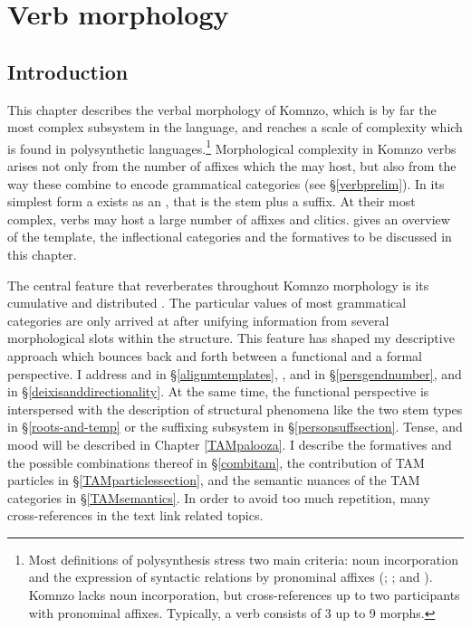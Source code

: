 
\chapter{Verb morphology} \label{cha:verb morphology}

\section{Introduction} \label{verbmorphintro}

This chapter describes the verbal morphology of Komnzo, which is by far the most complex subsystem in the language, and reaches a scale of complexity which is found in polysynthetic languages.\footnote{Most definitions of polysynthesis stress two main criteria: noun incorporation and the expression of syntactic relations by pronominal affixes (\citealt[16]{Baker:1996poly}; \citealt[2]{Evans:2002sasse}; and \citealt{Mithun:2009wh}). Komnzo lacks noun incorporation, but cross-references up to two participants with pronominal affixes. Typically, a verb consists of 3 up to 9 morphs.} Morphological complexity in Komnzo verbs arises not only from the number of affixes which the  may host, but also from the way these combine to encode grammatical categories (see \S{}\ref{verbprelim}). In its simplest form a  exists as an , that is the stem plus a  suffix. At their most complex, verbs may host a large number of affixes and clitics.  gives an overview of the  template, the inflectional categories and the formatives to be discussed in this chapter.%

The central feature that reverberates throughout Komnzo  morphology is its cumulative and distributed . The particular values of most grammatical categories are only arrived at after unifying information from several morphological slots within the  structure. This feature has shaped my descriptive approach which bounces back and forth between a functional and a formal perspective. I address  and  in \S{}\ref{alignmtemplates}, ,  and  in \S{}\ref{persgendnumber},  and  in \S{}\ref{deixisanddirectionality}. At the same time, the functional perspective is interspersed with the description of structural phenomena like the two stem types in \S{}\ref{roots-and-temp} or the suffixing subsystem in \S{}\ref{personsuffsection}. Tense,  and mood will be described in Chapter \ref{TAMpalooza}. I describe the formatives and the possible combinations thereof in \S{}\ref{combitam}, the contribution of TAM particles in \S{}\ref{TAMparticlessection}, and the semantic nuances of the TAM categories in \S{}\ref{TAMsemantics}. In order to avoid too much repetition, many cross-references in the text link related topics.

